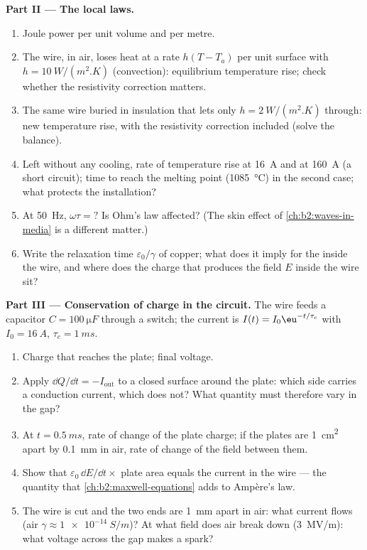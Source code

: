 \begin{problem}
\medskip
\noindent\textbf{Part II --- The local laws.}
\begin{enumerate}[resume]
  \item Joule power per unit volume and per metre.
  \item The wire, in air, loses heat at a rate $h(T - T_a)$ per unit
        surface with $h = \qty{10}{W/(m^2.K)}$ (convection): equilibrium
        temperature rise; check whether the resistivity correction
        matters.
  \item The same wire buried in insulation that lets only $h =
        \qty{2}{W/(m^2.K)}$ through: new temperature rise, with the
        resistivity correction included (solve the balance).
  \item Left without any cooling, rate of temperature rise at \qty{16}{A}
        and at \qty{160}{A} (a short circuit); time to reach the melting
        point (\qty{1085}{\degreeCelsius}) in the second case; what protects
        the installation?
  \item At \qty{50}{Hz}, $\omega\tau = ?$ Is Ohm's law affected? (The skin
        effect of \cref{ch:b2:waves-in-media} is a different matter.)
  \item Write the relaxation time $\varepsilon_0/\gamma$ of copper; what does it
        imply for the  inside the wire, and where does
        the charge that produces the field $E$ inside the wire sit?
\end{enumerate}

\medskip
\noindent\textbf{Part III --- Conservation of charge in the circuit.}
The wire feeds a capacitor $C = \qty{100}{\micro F}$ through a switch; the
current is $I(t) = I_0\eu^{-t/\tau_c}$ with $I_0 = \qty{16}{A}$, $\tau_c = \qty{1}{ms}$.
\begin{enumerate}[resume]
  \item Charge that reaches the plate; final voltage.
  \item Apply $\dd Q/\dd t = -I_{\text{out}}$ to a closed surface around the
        plate: which side carries a conduction current, which does not?
        What quantity must therefore vary in the gap?
  \item At $t = \qty{0.5}{ms}$, rate of change of the plate charge; if the
        plates are \qty{1}{cm^2} apart by \qty{0.1}{mm} in air, rate of
        change of the field between them.
  \item Show that $\varepsilon_0\,\dd E/\dd t \times$ plate area equals the current
        in the wire --- the quantity that \cref{ch:b2:maxwell-equations}
        adds to Ampère's law.
  \item The wire is cut and the two ends are \qty{1}{mm} apart in air:
        what current flows (air $\gamma \approx \qty{1e-14}{S/m}$)? At what
        field does air break down (\qty{3}{MV/m}): what voltage across the
        gap makes a spark?
\end{enumerate}


\end{problem}
